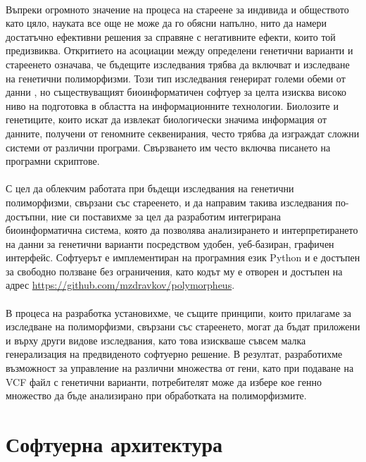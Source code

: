 \documentclass[pdftex,cyrillic,14pt,a4page,twoside,openright]{extreport}
\begin{document}
\paragraph{}
Въпреки огромното значение на процеса на стареене за индивида и обществото като цяло, науката все още не може да го обясни напълно, нито да намери достатъчно ефективни решения за справяне с негативните ефекти, които той предизвиква. Откритието на асоциации между определени генетични варианти и стареенето \cite{vijg2009, zhang2010, hamann2019} означава, че бъдещите изследвания трябва да включват и изследване на генетични полиморфизми. Този тип изследвания генерират големи обеми от данни \cite{clarke2012}, но съществуващият биоинформатичен софтуер за целта изисква високо ниво на подготовка в областта на информационните технологии. Биолозите и генетиците, които искат да извлекат биологически значима информация от данните, получени от геномните секвенирания, често трябва да изграждат сложни системи от различни програми. Свързването им често включва писането на програмни скриптове.

\paragraph{}
С цел да облекчим работата при бъдещи изследвания на генетични полиморфизми, свързани със стареенето, и да направим такива изследвания по-достъпни, ние си поставихме за цел да разработим интегрирана биоинформатична система, която да позволява анализирането и интерпретирането на данни за генетични варианти посредством удобен, уеб-базиран, графичен интерфейс. Софтуерът е имплементиран на програмния език Python и е достъпен за свободно ползване без ограничения, като кодът му е отворен и достъпен на адрес \url{https://github.com/mzdravkov/polymorpheus}.

\paragraph{}
В процеса на разработка установихме, че същите принципи, които прилагаме за изследване на полиморфизми, свързани със стареенето, могат да бъдат приложени и върху други видове изследвания, като това изискваше съвсем малка генерализация на предвиденото софтуерно решение. В резултат, разработихме възможност за управление на различни множества от гени, като при подаване на VCF файл с генетични варианти, потребителят може да избере кое генно множество да бъде анализирано при обработката на полиморфизмите.

\section{Софтуерна архитектура}
\end{document}
